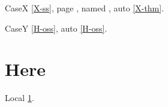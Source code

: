 \documentclass{article}
\begin{document}
CaseX \ref{X-ss}, page \pageref{X-front}, named ,
auto \autoref{X-thm}.

CaseY \ref{H-oss}, auto \autoref{H-oss}.

\section{Here}\label{here}
Local \ref{here}.
\end{document}
